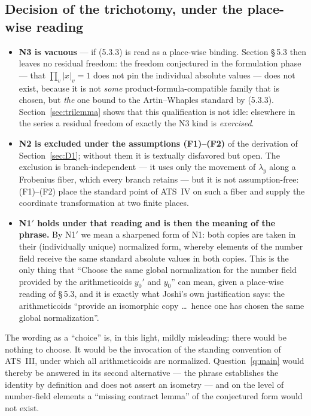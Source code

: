 \documentclass[11pt,a4paper]{article}
\theoremstyle{definition}
\theoremstyle{plain}
\theoremstyle{definition}
\begin{document}
\subsection{Decision of the trichotomy, under the place-wise reading}
\label{sec:trichotomy}

\begin{itemize}
\item \textbf{N3 is vacuous} --- if (5.3.3) is read as a place-wise binding.
  Section \S\,5.3 then leaves no residual freedom: the freedom conjectured in the
  formulation phase --- that $\prod_v |x|_v = 1$ does not pin the individual
  absolute values --- does not exist, because it is not \emph{some}
  product-formula-compatible family that is chosen, but \emph{the} one bound to
  the Artin--Whaples standard by (5.3.3). Section~\ref{sec:trilemma} shows that
  this qualification is not idle: elsewhere in the series a residual freedom of
  exactly the N3 kind is \emph{exercised}.
\item \textbf{N2 is excluded under the assumptions (F1)--(F2)} of the derivation
  of Section~\ref{sec:D1}; without them it is textually disfavored but open. The
  exclusion is branch-independent --- it uses only the movement of $\lambda_y$
  along a Frobenius fiber, which every branch retains --- but it is not
  assumption-free: (F1)--(F2) place the standard point of ATS~IV on such a fiber
  and supply the coordinate transformation at two finite places.
\item \textbf{N1$'$ holds under that reading and is then the meaning of the
  phrase.} By N1$'$ we mean a sharpened form of N1: both copies are taken in their
  (individually unique) normalized form, whereby elements of the number field
  receive the same standard absolute values in both copies. This is the only thing
  that ``Choose the same global normalization for the number field provided by the
  arithmeticoids $y_0'$ and $y_0$'' can mean, given a place-wise reading of
  \S\,5.3, and it is exactly what Joshi's own justification says: the
  arithmeticoids ``provide an isomorphic copy \ldots\ hence one has chosen the same
  global normalization''.
\end{itemize}

The wording as a ``choice'' is, in this light, mildly misleading: there would be
nothing to choose. It would be the invocation of the standing convention of
ATS~III, under which all arithmeticoids are normalized. Question~\ref{q:main}
would thereby be answered in its second alternative --- the phrase establishes the
identity by definition and does not assert an isometry --- and on the level of
number-field elements a ``missing contract lemma'' of the conjectured form would
not exist.
\end{document}
